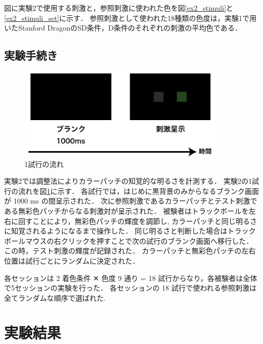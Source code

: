        図に実験2で使用する刺激と，参照刺激に使われた色を図\ref{ex2_stimuli}と\ref{ex2_stimuli_set}に示す．
        参照刺激として使われた18種類の色度は，実験1で用いたStanford DragonのSD条件，D条件のそれぞれの刺激の平均色である．

    \subsection{実験手続き}

        \begin{figure}[h]
            \centering
            \includegraphics[width=10.0cm]{./img/ex2_procedure.png}
            \caption{1試行の流れ}
            \label{ex2_procedure}
        \end{figure}

        実験2では調整法によりカラーパッチの知覚的な明るさを計測する．
        実験2の1試行の流れを図\ref{ex2_procedure}に示す．
        各試行では，はじめに黒背景のみからなるブランク画面が 1000 ms の間呈示された．
        次に参照刺激であるカラーパッチとテスト刺激である無彩色パッチからなる刺激対が呈示された．
        被験者はトラックボールを左右に回すことにより，無彩色パッチの輝度を調節し, カラーパッチと同じ明るさに知覚されるようになるまで操作した．
        同じ明るさと判断した場合はトラックボールマウスの右クリックを押すことで次の試行のブランク画面へ移行した．
        この時，テスト刺激の輝度が記録された．
        カラーパッチと無彩色パッチの左右位置は試行ごとにランダムに決定された．

        各セッションは 2 着色条件 ✕ 色度 9 通り = 18 試行からなり，各被験者は全体で5セッションの実験を行った．
        各セッションの 18 試行で使われる参照刺激は全てランダムな順序で選ばれた.

\section{実験結果}

